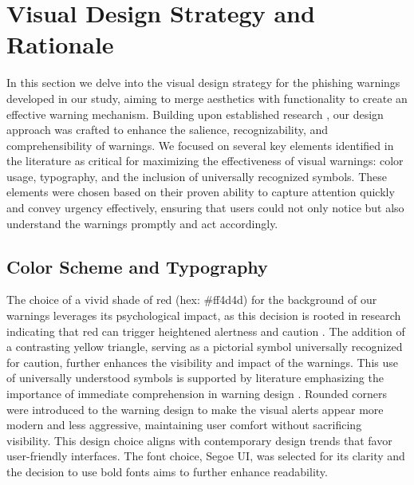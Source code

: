\documentclass[
  a4paper,  %
  twoside,  %
  bibliography=totoc,
  headsepline,
  cleardoublepage=empty,
  parskip=half,
  draft=false
]{scrbook}
\begin{document}
\section{Visual Design Strategy and Rationale}
In this section we delve into the visual design strategy for the phishing warnings developed in our study, aiming to merge aesthetics with functionality to create an effective warning mechanism. Building upon established research \cite{wogalter2002}, our design approach was crafted to enhance the salience, recognizability, and comprehensibility of warnings. We focused on several key elements identified in the literature as critical for maximizing the effectiveness of visual warnings: color usage, typography, and the inclusion of universally recognized symbols. These elements were chosen based on their proven ability to capture attention quickly and convey urgency effectively, ensuring that users could not only notice but also understand the warnings promptly and act accordingly.

\subsection{Color Scheme and Typography}
The choice of a vivid shade of red (hex: \#ff4d4d) for the background of our warnings leverages its psychological impact, as this decision is rooted in research indicating that red can trigger heightened alertness and caution \cite{kuniecki, wogalter2002}. The addition of a contrasting yellow triangle, serving as a pictorial symbol universally recognized for caution, further enhances the visibility and impact of the warnings. This use of universally understood symbols is supported by literature emphasizing the importance of immediate comprehension in warning design \cite{wogalter2002}. \newline
Rounded corners were introduced to the warning design to make the visual alerts appear more modern and less aggressive, maintaining user comfort without sacrificing visibility. This design choice aligns with contemporary design trends that favor user-friendly interfaces. \newline
The font choice, Segoe UI, was selected for its clarity and the decision to use bold fonts aims to further enhance readability.
\end{document}
